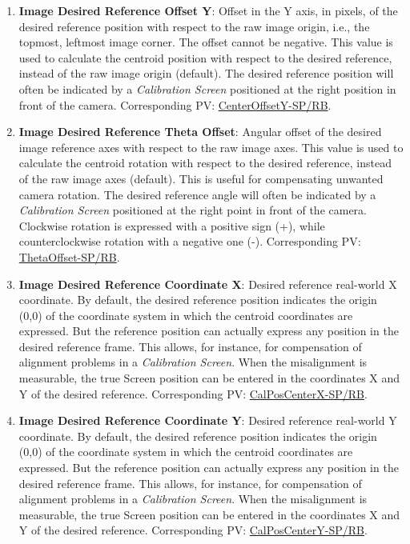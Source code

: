 \documentclass[openany]{article}
\begin{document}
\begin{enumerate}
            \item \textbf{Image Desired Reference Offset Y}: Offset in the Y axis, in pixels, of the desired reference position with respect to the raw image origin, i.e., the topmost, leftmost image corner. The offset cannot be negative. This value is used to calculate the centroid position with respect to the desired reference, instead of the raw image origin (default). The desired reference position will often be indicated by a \emph{Calibration Screen} positioned at the right position in front of the camera. Corresponding PV: \hyperlink{pv:center-offset-y}{CenterOffsetY-SP/RB}.
            \item \textbf{Image Desired Reference Theta Offset}: Angular offset of the desired image reference axes with respect to the raw image axes. This value is used to calculate the centroid rotation with respect to the desired reference, instead of the raw image axes (default). This is useful for compensating unwanted camera rotation. The desired reference angle will often be indicated by a \emph{Calibration Screen} positioned at the right point in front of the camera. Clockwise rotation is expressed with a positive sign (+), while counterclockwise rotation with a negative one (-). Corresponding PV: \hyperlink{pv:theta-offset}{ThetaOffset-SP/RB}.
            \item \textbf{Image Desired Reference Coordinate X}: Desired reference real-world X coordinate. By default, the desired reference position indicates the origin (0,0) of the coordinate system in which the centroid coordinates are expressed. But the reference position can actually express any position in the desired reference frame. This allows, for instance, for compensation of alignment problems in a \emph{Calibration Screen}. When the misalignment is measurable, the true Screen position can be entered in the coordinates X and Y of the desired reference. Corresponding PV: \hyperlink{pv:cal-pos-center-x}{CalPosCenterX-SP/RB}.
            \item \textbf{Image Desired Reference Coordinate Y}: Desired reference real-world Y coordinate. By default, the desired reference position indicates the origin (0,0) of the coordinate system in which the centroid coordinates are expressed. But the reference position can actually express any position in the desired reference frame. This allows, for instance, for compensation of alignment problems in a \emph{Calibration Screen}. When the misalignment is measurable, the true Screen position can be entered in the coordinates X and Y of the desired reference. Corresponding PV: \hyperlink{pv:cal-pos-center-y}{CalPosCenterY-SP/RB}.
        \end{enumerate}
\end{document}
